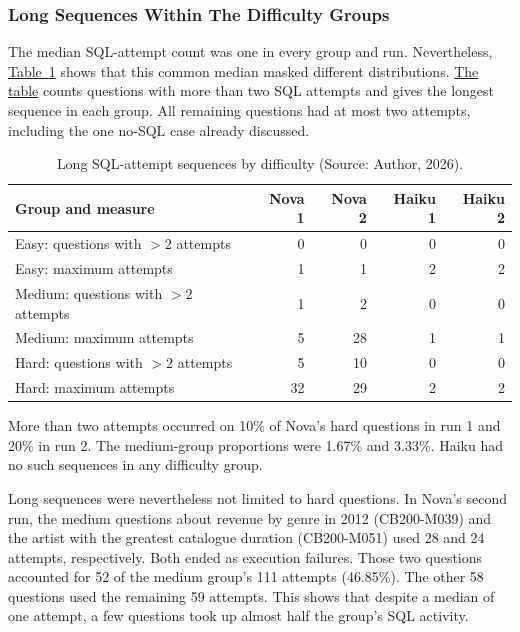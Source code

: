 \subsubsection{Long Sequences Within The Difficulty Groups}
The median SQL-attempt count was one in every group and run.
Nevertheless, \hyperref[tab:results-difficulty-attempts]{Table~\ref*{tab:results-difficulty-attempts}}
shows that this common median masked different distributions.
\hyperref[tab:results-difficulty-attempts]{The table} 
counts questions with more than two SQL attempts and gives
the longest sequence in each group. 
All remaining questions had at most two attempts, 
including the one no-SQL case already discussed.

\begin{table}[H]
\centering
{\small
\setlength{\tabcolsep}{4pt}
\begin{tabularx}{\textwidth}{@{}>{\raggedright\arraybackslash}Xrrrr@{}}
\toprule
\textbf{Group and measure} & \textbf{Nova 1} & \textbf{Nova 2} & \textbf{Haiku 1} & \textbf{Haiku 2} \\
\midrule
Easy: questions with $>2$ attempts & 0 & 0 & 0 & 0 \\
Easy: maximum attempts & 1 & 1 & 2 & 2 \\
\addlinespace[0.5em]
Medium: questions with $>2$ attempts & 1 & 2 & 0 & 0 \\
Medium: maximum attempts & 5 & 28 & 1 & 1 \\
\addlinespace[0.5em]
Hard: questions with $>2$ attempts & 5 & 10 & 0 & 0 \\
Hard: maximum attempts & 32 & 29 & 2 & 2 \\
\bottomrule
\end{tabularx}
}
\caption{Long SQL-attempt sequences by difficulty (Source: Author, 2026).}
\label{tab:results-difficulty-attempts}
\end{table}

More than two attempts occurred on 10\% of Nova's hard questions in run 1
and 20\% in run 2.
The medium-group proportions were 1.67\% and 3.33\%. 
Haiku had no such sequences in any difficulty group.

Long sequences were nevertheless not limited to hard questions.
In Nova's second run, the medium questions about revenue by genre in 2012
(CB200-M039) and the artist with the greatest catalogue duration (CB200-M051) 
used 28 and 24 attempts, respectively. 
Both ended as execution failures.
Those two questions accounted for 52 of the medium group's 111 attempts
(46.85\%).
The other 58 questions used the remaining 59 attempts.
This shows that despite a median of one attempt, 
a few questions took up almost half the group's SQL activity.

